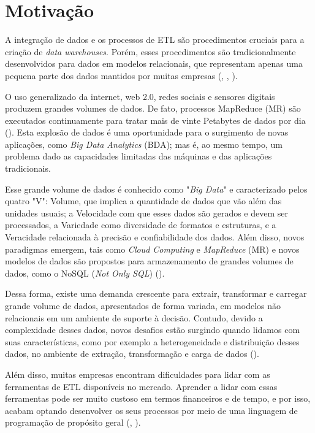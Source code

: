 \section{Motivação}

A integração de dados e os processos de ETL são procedimentos cruciais para a criação de \textit{data warehouses}. Porém, esses procedimentos são tradicionalmente desenvolvidos para dados em modelos relacionais, que representam apenas uma pequena parte dos dados mantidos por muitas empresas (\cite{darmont:2005}, \cite{russom:2007}, \cite{thomsen:2009}).

O uso generalizado da internet, web 2.0, redes sociais e sensores digitais produzem grandes volumes de dados. De fato, processos MapReduce (MR) são executados continuamente para tratar mais de vinte Petabytes de dados por dia (\cite{dean:2008}). Esta explosão de dados é uma oportunidade para o surgimento de novas aplicações, como \textit{Big Data Analytics} (BDA); mas é, ao mesmo tempo, um problema dado as capacidades limitadas das máquinas e das aplicações tradicionais.

Esse grande volume de dados é conhecido como "\textit{Big Data}" e caracterizado pelos quatro "V": Volume, que implica a quantidade de dados que vão além das unidades usuais; a Velocidade com que esses dados são gerados e devem ser processados, a Variedade como diversidade de formatos e estruturas, e a Veracidade relacionada à precisão e confiabilidade dos dados. Além disso, novos paradigmas emergem, tais como \textit{Cloud Computing} e \textit{MapReduce} (MR) e novos modelos de dados são propostos para armazenamento de grandes volumes de dados, como o NoSQL (\textit{Not Only SQL}) (\cite{dean:2011}).

Dessa forma, existe uma demanda crescente para extrair, transformar e carregar grande volume de dados, apresentados de forma variada, em modelos não relacionais em um ambiente de suporte à decisão. Contudo, devido a complexidade desses dados, novos desafios estão surgindo quando lidamos com suas características, como por exemplo a heterogeneidade e distribuição desses dados, no ambiente de extração, transformação e carga de dados (\cite{salem:2012}).

Além disso, muitas empresas encontram dificuldades para lidar com as ferramentas de ETL disponíveis no mercado. Aprender a lidar com essas ferramentas pode ser muito custoso em termos financeiros e de tempo, e por isso, acabam optando desenvolver os seus processos por meio de uma linguagem de programação de propósito geral (\cite{awad:2011}, \cite{munoz:2009}).

